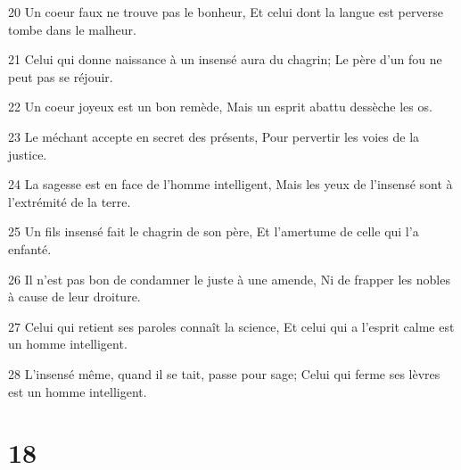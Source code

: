 \par 20 Un coeur faux ne trouve pas le bonheur, Et celui dont la langue est perverse tombe dans le malheur.
\par 21 Celui qui donne naissance à un insensé aura du chagrin; Le père d'un fou ne peut pas se réjouir.
\par 22 Un coeur joyeux est un bon remède, Mais un esprit abattu dessèche les os.
\par 23 Le méchant accepte en secret des présents, Pour pervertir les voies de la justice.
\par 24 La sagesse est en face de l'homme intelligent, Mais les yeux de l'insensé sont à l'extrémité de la terre.
\par 25 Un fils insensé fait le chagrin de son père, Et l'amertume de celle qui l'a enfanté.
\par 26 Il n'est pas bon de condamner le juste à une amende, Ni de frapper les nobles à cause de leur droiture.
\par 27 Celui qui retient ses paroles connaît la science, Et celui qui a l'esprit calme est un homme intelligent.
\par 28 L'insensé même, quand il se tait, passe pour sage; Celui qui ferme ses lèvres est un homme intelligent.

\chapter{18}

